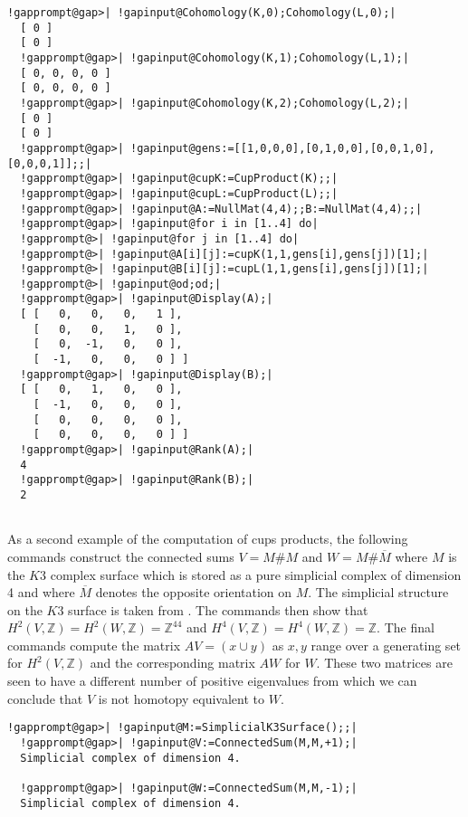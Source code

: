 \documentclass[a4paper,11pt]{report}
\begin{document}
{{\begin{Verbatim}[commandchars=!@|,fontsize=\small,frame=single,label=Example]
  !gapprompt@gap>| !gapinput@Cohomology(K,0);Cohomology(L,0);|
  [ 0 ]
  [ 0 ]
  !gapprompt@gap>| !gapinput@Cohomology(K,1);Cohomology(L,1);|
  [ 0, 0, 0, 0 ]
  [ 0, 0, 0, 0 ]
  !gapprompt@gap>| !gapinput@Cohomology(K,2);Cohomology(L,2);|
  [ 0 ]
  [ 0 ]
  !gapprompt@gap>| !gapinput@gens:=[[1,0,0,0],[0,1,0,0],[0,0,1,0],[0,0,0,1]];;|
  !gapprompt@gap>| !gapinput@cupK:=CupProduct(K);;|
  !gapprompt@gap>| !gapinput@cupL:=CupProduct(L);;|
  !gapprompt@gap>| !gapinput@A:=NullMat(4,4);;B:=NullMat(4,4);;|
  !gapprompt@gap>| !gapinput@for i in [1..4] do|
  !gapprompt@>| !gapinput@for j in [1..4] do|
  !gapprompt@>| !gapinput@A[i][j]:=cupK(1,1,gens[i],gens[j])[1];|
  !gapprompt@>| !gapinput@B[i][j]:=cupL(1,1,gens[i],gens[j])[1];|
  !gapprompt@>| !gapinput@od;od;|
  !gapprompt@gap>| !gapinput@Display(A);|
  [ [   0,   0,   0,   1 ],
    [   0,   0,   1,   0 ],
    [   0,  -1,   0,   0 ],
    [  -1,   0,   0,   0 ] ]
  !gapprompt@gap>| !gapinput@Display(B);|
  [ [   0,   1,   0,   0 ],
    [  -1,   0,   0,   0 ],
    [   0,   0,   0,   0 ],
    [   0,   0,   0,   0 ] ]
  !gapprompt@gap>| !gapinput@Rank(A);|
  4
  !gapprompt@gap>| !gapinput@Rank(B);|
  2
  
\end{Verbatim}
 

 As a second example of the computation of cups products, the following
commands construct the connected sums $V=M\# M$ and $W=M\# \overline M$ where $M$ is the $K3$ complex surface which is stored as a pure simplicial complex of dimension 4
and where $\overline M$ denotes the opposite orientation on $M$. The simplicial structure on the $K3$ surface is taken from \cite{spreerkhuenel}. The commands then show that $H^2(V,\mathbb Z)=H^2(W,\mathbb Z)=\mathbb Z^{44}$ and $H^4(V,\mathbb Z)=H^4(W,\mathbb Z)=\mathbb Z$. The final commands compute the matrix $AV=(x\cup y)$ as $x,y$ range over a generating set for $H^2(V,\mathbb Z)$ and the corresponding matrix $AW$ for $W$. These two matrices are seen to have a different number of positive
eigenvalues from which we can conclude that $V$ is not homotopy equivalent to $W$. 
\begin{Verbatim}[commandchars=!@|,fontsize=\small,frame=single,label=Example]
  !gapprompt@gap>| !gapinput@M:=SimplicialK3Surface();;|
  !gapprompt@gap>| !gapinput@V:=ConnectedSum(M,M,+1);|
  Simplicial complex of dimension 4.
  
  !gapprompt@gap>| !gapinput@W:=ConnectedSum(M,M,-1);|
  Simplicial complex of dimension 4.
  

\end{Verbatim}}}
\end{document}

